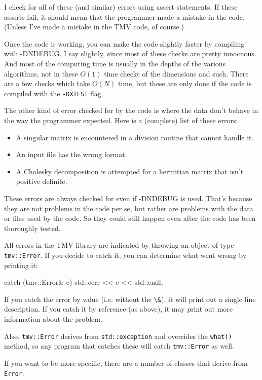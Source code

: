 \documentclass[twoside,letterpaper,11pt]{article}
\renewcommand{\tt}[1]{{\lstinline {#1}}}
\begin{document}
I check for all of these (and similar) errors using assert statements.
If these asserts fail, it should mean that
the programmer made a mistake in the code.  (Unless I've made a 
mistake in the TMV code, of course.)

Once the code is working, you can make the code slightly faster by 
compiling with -DNDEBUG.  I say slightly, since most of these checks 
are pretty innocuous.  And most of the computing time is usually in the depths
of the various algorithms, not in these $O(1)$ time checks of the dimensions and such.  
There are a few checks which take $O(N)$ time, but these are only done
if the code is compiled with the \tt{-DXTEST} flag.

The other kind of error checked for by the code is 
where the data don't behave in the way
the programmer expected.  Here is a (complete) list of these errors:
\begin{itemize}
\item
A singular matrix is encountered in a division routine that cannot handle it.
\item
An input file has the wrong format.
\item
A Cholesky decomposition is attempted for a
hermitian matrix that isn't positive definite.
\end{itemize}

These errors are always checked for even if -DNDEBUG is used.
That's because they are not problems in the code per se, but rather
are problems with the data or files used by the code.  So they could
still happen even after the code has been thoroughly tested.

All errors in the TMV library are indicated by throwing an object of type
\tt{tmv::Error}.  If you decide to catch it, you can determine what went
wrong by printing it:
\begin{tmvcode}
catch (tmv::Error& e) {
  std::cerr << e << std::endl;
}
\end{tmvcode}
If you catch the error by value (i.e. without the \tt{\&}), it will print out
a single line description.  If you catch it by reference (as above), it may 
print out more information about the problem.

Also, \tt{tmv::Error} derives from \tt{std::exception} and overrides the \tt{what()}
method, so any program that catches these will catch \tt{tmv::Error} as well.

If you want to be more specific, there are a number of classes that derive from
\tt{Error}:
\end{document}
